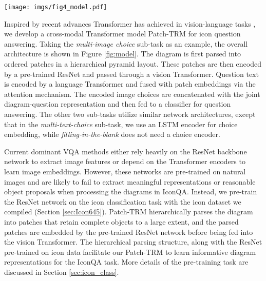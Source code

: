 \documentclass{article}
\begin{document}
\begin{figure*}[t]
    \centering 
\texttt{[image: imgs/fig4\_model.pdf]}
\caption{Our IconQA baseline Patch-TRM. Patch-TRM takes patches parsed from a hierarchical pyramid layout and embeds them through ResNet pre-trained on our Icon645 dataset. The joint diagram-question feature is  learned via cross-modal Transformers followed by the attention module.}
\label{fig:model}
\end{figure*}

Inspired by recent advances Transformer has achieved in vision-language tasks \cite{li2019visualbert,lu2019vilbert}, we develop a cross-modal Transformer model Patch-TRM for icon question answering. Taking the \textit{multi-image choice} sub-task as an example, the overall architecture is shown in Figure \ref{fig:model}. The diagram is first parsed into ordered patches in a hierarchical pyramid layout. These patches are then encoded by a pre-trained ResNet and passed through a vision Transformer. Question text is encoded by a language Transformer and fused with patch embeddings via the attention mechanism. The encoded image choices are concatenated with the joint diagram-question representation and then fed to a classifier for question answering. The other two sub-tasks utilize similar network architectures, except that in the \textit{multi-text-choice} sub-task, we use an LSTM encoder \cite{hochreiter1997long} for choice embedding, while \textit{filling-in-the-blank} does not need a choice encoder. 

Current dominant VQA methods either rely heavily on the ResNet backbone network to extract image features or depend on the Transformer encoders to learn image embeddings. However, these networks are pre-trained on natural images  and are likely to fail to extract meaningful representations or reasonable object proposals when processing the diagrams in IconQA. Instead, we pre-train the ResNet network on the icon classification task with the icon dataset we compiled (Section \ref{sec:Icon645}). Patch-TRM hierarchically parses the diagram into patches that retain complete objects to a large extent, and the parsed patches are embedded by the pre-trained ResNet network before being fed into the vision Transformer. The hierarchical parsing structure, along with the ResNet pre-trained on icon data facilitate our Patch-TRM to learn informative diagram representations for the IconQA task. More details of the pre-training task are discussed in Section \ref{sec:icon_class}.
\end{document}
